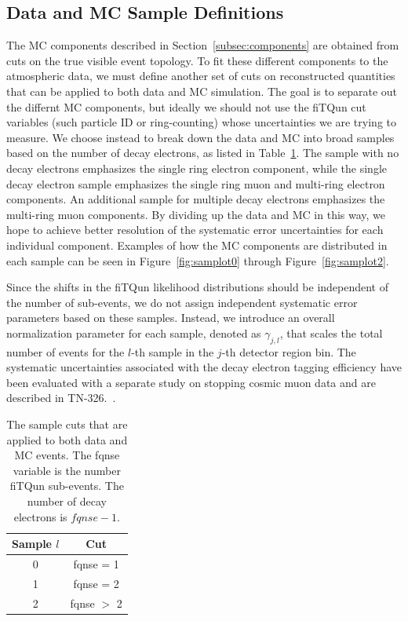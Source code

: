 \subsection{Data and MC Sample Definitions}
\label{subsec:samples}

The MC components described in Section~\ref{subsec:components} are obtained from
cuts on the true visible event topology.  To fit these different components to
the atmospheric data, we must define another set of cuts on reconstructed quantities
that can be applied to both data and MC simulation.  The goal is to 
separate out the differnt MC components, but ideally we should not
use the fiTQun cut variables (such particle ID or ring-counting) whose
uncertainties we are trying to measure.  We choose instead to break down the
data and MC into broad samples based on the number of decay electrons, as listed
in Table~\ref{tab:samples}.  The sample with no decay electrons emphasizes the
single ring electron component, while the single decay electron sample
emphasizes the single ring muon and multi-ring electron components. An
additional sample for multiple decay electrons emphasizes the multi-ring muon
components.  By dividing up the data and MC in this way, we hope to achieve better
resolution of the systematic error uncertainties for each individual component.
Examples of how the MC components are distributed in each sample can be seen in
Figure~\ref{fig:samplot0} through Figure~\ref{fig:samplot2}.

Since the shifts in the fiTQun likelihood distributions should be independent of the
number of sub-events, we do not assign independent systematic error parameters
based on these samples. Instead, we introduce an overall normalization
parameter for each sample, denoted as $\gamma_{j,l}$, that scales the total
number of events for the $l$-th sample in the $j$-th detector region bin.  The systematic 
uncertainties associated with the decay electron tagging efficiency have been
evaluated with a separate study on stopping cosmic muon data and are
described in TN-326.~\cite{tn326}.

\begin{table}
  \centering
  \begin{tabular}{c | c}
    \hline\hline
    Sample $l$ & Cut \\
    \hline
    0 & fqnse = 1 \\
    1 & fqnse = 2 \\
    2 & fqnse $>$ 2 \\
    \hline\hline
  \end{tabular}
  \caption{The sample cuts that are applied to both data and MC events. The
  fqnse variable is the number fiTQun sub-events. The number of decay electrons
  is $fqnse -1$. }
  \label{tab:samples}
\end{table}


